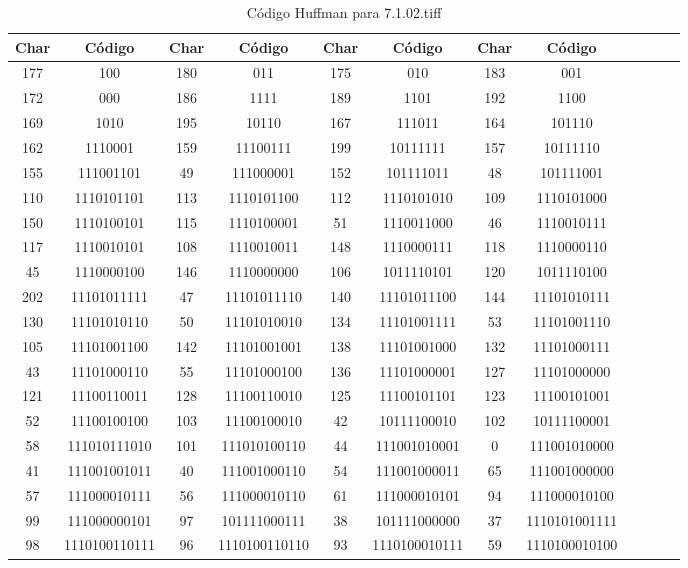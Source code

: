 \documentclass[conference,onecolumn,12pt]{IEEEtran}
\numberwithin{equation}{subsection}
\begin{document}
\begin{itemize}
\begin{table}[H]
\centering
\caption{Código Huffman para 7.1.02.tiff}
\label{tab:huffman_7.1.02.tiff}
\scriptsize
\begin{tabular}{cccccccccccc}
\toprule
\textbf{Char} & \textbf{Código} & \textbf{Char} & \textbf{Código} & \textbf{Char} & \textbf{Código} & \textbf{Char} & \textbf{Código} \\
\midrule
177 & 100 & 180 & 011 & 175 & 010 & 183 & 001 \\
172 & 000 & 186 & 1111 & 189 & 1101 & 192 & 1100 \\
169 & 1010 & 195 & 10110 & 167 & 111011 & 164 & 101110 \\
162 & 1110001 & 159 & 11100111 & 199 & 10111111 & 157 & 10111110 \\
155 & 111001101 & 49 & 111000001 & 152 & 101111011 & 48 & 101111001 \\
110 & 1110101101 & 113 & 1110101100 & 112 & 1110101010 & 109 & 1110101000 \\
150 & 1110100101 & 115 & 1110100001 & 51 & 1110011000 & 46 & 1110010111 \\
117 & 1110010101 & 108 & 1110010011 & 148 & 1110000111 & 118 & 1110000110 \\
45 & 1110000100 & 146 & 1110000000 & 106 & 1011110101 & 120 & 1011110100 \\
202 & 11101011111 & 47 & 11101011110 & 140 & 11101011100 & 144 & 11101010111 \\
130 & 11101010110 & 50 & 11101010010 & 134 & 11101001111 & 53 & 11101001110 \\
105 & 11101001100 & 142 & 11101001001 & 138 & 11101001000 & 132 & 11101000111 \\
43 & 11101000110 & 55 & 11101000100 & 136 & 11101000001 & 127 & 11101000000 \\
121 & 11100110011 & 128 & 11100110010 & 125 & 11100101101 & 123 & 11100101001 \\
52 & 11100100100 & 103 & 11100100010 & 42 & 10111100010 & 102 & 10111100001 \\
58 & 111010111010 & 101 & 111010100110 & 44 & 111001010001 & 0 & 111001010000 \\
41 & 111001001011 & 40 & 111001000110 & 54 & 111001000011 & 65 & 111001000000 \\
57 & 111000010111 & 56 & 111000010110 & 61 & 111000010101 & 94 & 111000010100 \\
99 & 111000000101 & 97 & 101111000111 & 38 & 101111000000 & 37 & 1110101001111 \\
98 & 1110100110111 & 96 & 1110100110110 & 93 & 1110100010111 & 59 & 1110100010100 \\

\end{tabular}
\end{table}
\end{itemize}
\end{document}
